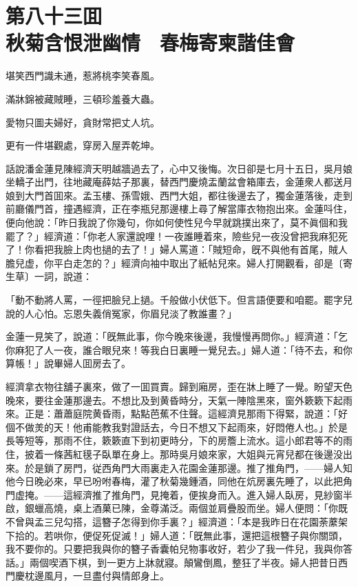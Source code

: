 
\chapter*{第八十三囬　\\秋菊含恨泄幽情　春梅寄柬諧佳會}


\begin{myquote}
堪笑西門識未通，惹將桃李笑春風。

滿牀錦被藏賊睡，三頓珍羞養大蟲。

愛物只圖夫婦好，貪財常把丈人坑。

更有一件堪觀處，穿房入屋弄乾坤。
\end{myquote}

話說潘金蓮見陳經濟天明越牆過去了，心中又後悔。次日卻是七月十五日，吳月娘坐轎子出門，往地藏庵薛姑子那裏，替西門慶燒盂蘭盆會箱庫去，金蓮衆人都送月娘到大門首囬來。孟玉樓、孫雪娥、西門大姐，都往後邊去了，獨金蓮落後，走到前廳儀門首，撞遇經濟，正在李瓶兒那邊樓上尋了解當庫衣物抱出來。金蓮呌住，便向他說：「昨日我說了你幾句，你如何使性兒今早就跳撲出來了，莫不眞個和我罷了？」經濟道：「你老人家還說哩！一夜誰睡着來，險些兒一夜没曾把我麻犯死了！你看把我臉上肉也撾的去了！」婦人罵道：「賊短命，旣不與他有首尾，賊人膽兒虚，你平白走怎的？」經濟向袖中取出了紙帖兒來。婦人打開觀看，卻是〔寄生草〕一詞，說道：

\begin{myquote}
「動不動將人罵，一徑把臉兒上撾。千般做小伏低下。但言語便要和咱罷。罷字兒說的人心怕。忘恩失義俏冤家，你眉兒淡了教誰畫？」
\end{myquote}

金蓮一見笑了，說道：「旣無此事，你今晚來後邊，我慢慢再問你。」經濟道：「乞你麻犯了人一夜，誰合眼兒來！等我白日裏睡一覺兒去。」婦人道：「待不去，和你算帳！」說畢婦人囬房去了。

經濟拿衣物往舖子裏來，做了一囬買賣。歸到廂房，歪在牀上睡了一覺。盼望天色晚來，要往金蓮那邊去。不想比及到黄昏時分，天氣一陣陰黑來，窗外簌簌下起雨來。正是：蕭蕭庭院黄昏雨，點點芭蕉不住聲。這經濟見那雨下得緊，說道：「好個不做羙的天！他甫能教我對證話去，今日不想又下起雨來，好悶倦人也。」於是長等短等，那雨不住，簌簌直下到初更時分，下的房簷上流水。這小郎君等不的雨住，披着一條茜紅氁子臥單在身上。那時吳月娘來家，大姐與元宵兒都在後邊没出來。於是鎖了房門，従西角門大雨裏走入花園金蓮那邊。推了推角門，——婦人知他今日晚必來，早已吩咐春梅，灌了秋菊幾鍾酒，同他在炕房裏先睡了，以此把角門虚掩。——這經濟推了推角門，見掩着，便挨身而入。進入婦人臥房，見紗窗半啟，銀蠟高燒，桌上酒菓已陳，金尊滿泛。兩個並肩疊股而坐。婦人便問：「你既不曾與孟三兒勾搭，這簪子怎得到你手裏？」經濟道：「本是我昨日在花園荼䕷架下拾的。若哄你，便促死促滅！」婦人道：「旣無此事，還把這根簪子與你關頭，我不要你的。只要把我與你的簪子香囊帕兒物事收好，若少了我一件兒，我與你答話。」兩個喫酒下棋，到一更方上牀就寢。顛鸞倒鳳，整狂了半夜。婦人把昔日西門慶枕邊風月，一旦盡付與情郎身上。

